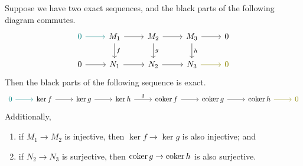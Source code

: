 \begin{theorem}\label{thm:snake}\label{lem:snake}
    Suppose we have two exact sequences,
    and the black parts of the following diagram commutes.
    \begin{equation*}
        \begin{tikzcd}
            \textcolor{teal}{0} \arrow[color=teal]{r} & M_1 \arrow{d}{f} \arrow{r} &
            M_2 \arrow{d}{g} \arrow{r} & M_3 \arrow{d}{h} \arrow{r} & 0 \\
            0 \arrow{r} & N_1 \arrow{r} & N_2 \arrow{r} & N_3 \arrow[color=olive]{r} & \textcolor{olive}{0}
        \end{tikzcd}
    \end{equation*}
    Then the black parts of the following sequence is exact.
    \begin{equation*}
        \begin{tikzcd}
            \textcolor{teal}{0} \arrow[color=teal]{r} &
            \ker f \arrow{r} & \ker g \arrow{r} & \ker h \arrow{r}{\delta} &
            \coker f \arrow{r} & \coker g \arrow{r} & \coker h \arrow[color=olive]{r} &
            \textcolor{olive}{0}
        \end{tikzcd}
    \end{equation*}
    Additionally,
    \begin{enumerate}[itemsep=0mm]
        \item[\textcolor{teal}{(a)}] if \(M_1 \to M_2\) is injective, then \(\ker f \to \ker g\) is also injective; and
        \item[\textcolor{olive}{(b)}] if \(N_2 \to N_3\) is surjective, then \(\operatorname{coker} g \to \operatorname{coker} h\) is also surjective.
    \end{enumerate}


\end{theorem}
